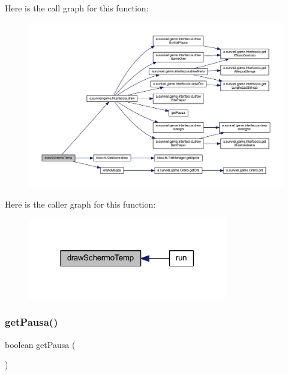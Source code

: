 Here is the call graph for this function\+:
\nopagebreak
\begin{figure}[H]
\begin{center}
\leavevmode
\includegraphics[width=350pt]{classa_1_1survival_1_1game_1_1_pannello_a65c6d6be4b2a0069d1920cb7f466643b_cgraph}
\end{center}
\end{figure}
Here is the caller graph for this function\+:
\nopagebreak
\begin{figure}[H]
\begin{center}
\leavevmode
\includegraphics[width=246pt]{classa_1_1survival_1_1game_1_1_pannello_a65c6d6be4b2a0069d1920cb7f466643b_icgraph}
\end{center}
\end{figure}
\mbox{\label{classa_1_1survival_1_1game_1_1_pannello_a6e565369e7a4cd8bee8616ba06ebae08}} 
\subsubsection{\texorpdfstring{get\+Pausa()}{getPausa()}}
{\footnotesize\ttfamily boolean get\+Pausa (\begin{DoxyParamCaption}{ }\end{DoxyParamCaption})}



